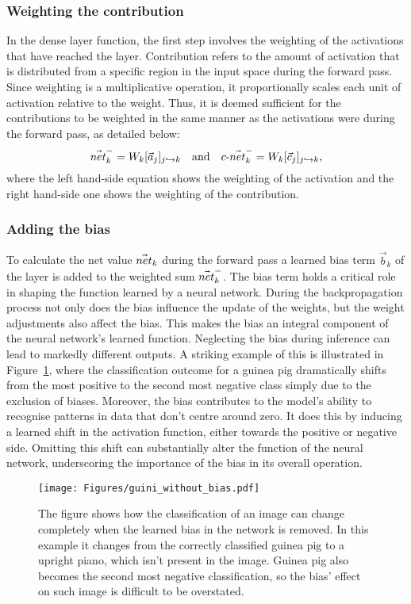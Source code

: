 \subsubsection{Weighting the contribution}
In the dense layer function, the first step involves the weighting of the activations that have reached the layer. Contribution refers to the amount of activation that is distributed from a specific region in the input space during the forward pass. Since weighting is a multiplicative operation, it proportionally scales each unit of activation relative to the weight. Thus, it is deemed sufficient for the contributions to be weighted in the same manner as the activations were during the forward pass, as detailed below:
\begin{equation*}
    \vec{net}_{k}^- = W_k [\vec{a}_j]_{j\hookrightarrow k}\quad\mbox{and}\quad
   \text{$c$-}\vec{net}_{k}^- = W_k[\vec{c}_j]_{j\hookrightarrow k},
\end{equation*}
where the left hand-side equation shows the weighting of the activation and the right hand-side one shows the weighting of the contribution.
\subsubsection{Adding the bias}
\label{section:adding_the_bias}
To calculate the net value $\vec{net}_{k}$ during the forward pass a learned bias term $\vec{b}_k$ of the layer is added to the weighted sum $\vec{net}_{k}^-$. 
The bias term holds a critical role in shaping the function learned by a neural network. During the backpropagation process not only does the bias influence the update of the weights, but the weight adjustments also affect the bias. This makes the bias an integral component of the neural network's learned function. Neglecting the bias during inference can lead to markedly different outputs. A striking example of this is illustrated in Figure~\ref{fig:bias_no_bias}, where the classification outcome for a guinea pig dramatically shifts from the most positive to the second most negative class simply due to the exclusion of biases. Moreover, the bias contributes to the model's ability to recognise patterns in data that don't centre around zero. It does this by inducing a learned shift in the activation function, either towards the positive or negative side. Omitting this shift can substantially alter the function of the neural network, underscoring the importance of the bias in its overall operation.

\begin{figure}[ht!]
	\begin{center}
		\texttt{[image: Figures/guini\_without\_bias.pdf]}
	\end{center}
	\caption{The figure shows how the classification of an image can change completely when the learned bias in the network is removed. In this example it changes from the correctly classified guinea pig to a upright piano, which isn't present in the image. Guinea pig also becomes the second most negative classification, so the bias' effect on such image is difficult to be overstated.}
	\label{fig:bias_no_bias}
\end{figure} 
\noindent

